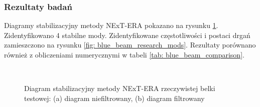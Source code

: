 \subsubsection{Rezultaty badań}
Diagramy stabilizacyjny metody NExT-ERA pokazano na rysunku \ref{fig: stab_diags_lab_blue_beam}. Zidentyfikowano 4 stabilne mody. Zidentyfikowane częstotliwości i postaci drgań zamieszczono na rysunku \ref{fig: blue_beam_research_mods}. Rezultaty porównano również z obliczeniami numerycznymi w tabeli \ref{tab: blue_beam_comparison}. 
\begin{figure}[h]
	\centering
	\\
	\captionsetup{justification=centering}
	\caption{Diagram stabilizacyjny metody NExT-ERA rzeczywistej belki testowej: (a) diagram niefiltrowany, (b) diagram filtrowany}
	\label{fig: stab_diags_lab_blue_beam}
\end{figure}

